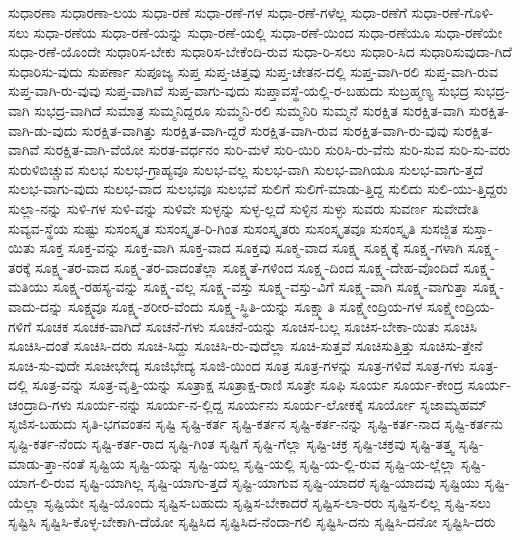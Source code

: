 {ಸುಧಾರಣಾ
ಸುಧಾರಣಾ-ಲಯ
ಸುಧಾ-ರಣೆ
ಸುಧಾ-ರಣೆ-ಗಳ
ಸುಧಾ-ರಣೆ-ಗಳೆಲ್ಲ
ಸುಧಾ-ರಣೆಗೆ
ಸುಧಾ-ರಣೆ-ಗೊಳಿ-ಸಲು
ಸುಧಾ-ರಣೆಯ
ಸುಧಾ-ರಣೆ-ಯನ್ನು
ಸುಧಾ-ರಣೆ-ಯಲ್ಲಿ
ಸುಧಾ-ರಣೆ-ಯಿಂದ
ಸುಧಾ-ರಣೆಯೂ
ಸುಧಾ-ರಣೆಯೇ
ಸುಧಾ-ರಣೆ-ಯೊಂದೇ
ಸುಧಾರಿಸ-ಬೇಕು
ಸುಧಾರಿಸ-ಬೇಕೆಂದಿ-ರುವ
ಸುಧಾ-ರಿ-ಸಲು
ಸುಧಾರಿ-ಸಿದ
ಸುಧಾರಿಸುವುದಾ-ಗಿದೆ
ಸುಧಾರಿಸು-ವುದು
ಸುಪರ್ಣಾ
ಸುಪೂಜ್ಯ
ಸುಪ್ತ
ಸುಪ್ತ-ಚಿತ್ತವು
ಸುಪ್ತ-ಚೇತನ-ದಲ್ಲಿ
ಸುಪ್ತ-ವಾಗಿ-ರಲಿ
ಸುಪ್ತ-ವಾಗಿ-ರುವ
ಸುಪ್ತ-ವಾಗಿ-ರು-ವುವು
ಸುಪ್ತ-ವಾಗಿವೆ
ಸುಪ್ತ-ವಾಗು-ವುದು
ಸುಪ್ತಾವಸ್ಥೆ-ಯಲ್ಲಿ-ರ-ಬಹುದು
ಸುಬ್ರಹ್ಮಣ್ಯ
ಸುಭದ್ರ
ಸುಭದ್ರ-ವಾಗಿ
ಸುಭದ್ರ-ವಾಗಿದೆ
ಸುಮಾತ್ರ
ಸುಮ್ಮನಿದ್ದರೂ
ಸುಮ್ಮನಿ-ರಲಿ
ಸುಮ್ಮನಿರಿ
ಸುಮ್ಮನೆ
ಸುರಕ್ಷಿತ
ಸುರಕ್ಷಿತ-ವಾಗಿ
ಸುರಕ್ಷಿತ-ವಾಗಿ-ಡು-ವುದು
ಸುರಕ್ಷಿತ-ವಾಗಿತ್ತು
ಸುರಕ್ಷಿತ-ವಾಗಿ-ದ್ದರೆ
ಸುರಕ್ಷಿತ-ವಾಗಿ-ರುವ
ಸುರಕ್ಷಿತ-ವಾಗಿ-ರು-ವುವು
ಸುರಕ್ಷಿತ-ವಾಗಿವೆ
ಸುರಕ್ಷಿತ-ವಾಗಿ-ವೆಯೋ
ಸುರತ-ವರ್ಧನಂ
ಸುರಿ-ಮಳೆ
ಸುರಿ-ಯಿರಿ
ಸುರಿಸಿ-ರು-ವೆನು
ಸುರಿ-ಸುವ
ಸುರಿ-ಸು-ವರು
ಸುರುಳಿಬಿಚ್ಚುವ
ಸುಲಭ
ಸುಲಭ-ಗ್ರಾಹ್ಯವೂ
ಸುಲಭ-ವಲ್ಲ
ಸುಲಭ-ವಾಗಿ
ಸುಲಭ-ವಾಗಿಯೂ
ಸುಲಭ-ವಾಗು-ತ್ತದೆ
ಸುಲಭ-ವಾಗು-ವುದು
ಸುಲಭ-ವಾದ
ಸುಲಭವೂ
ಸುಲಭವೆ
ಸುಲಿಗೆ
ಸುಲಿಗೆ-ಮಾಡು-ತ್ತಿದ್ದ
ಸುಲಿದು
ಸುಲಿ-ಯು-ತ್ತಿದ್ದರು
ಸುಲ್ಲಾ-ನನ್ನು
ಸುಳಿ-ಗಳ
ಸುಳಿ-ವನ್ನು
ಸುಳಿವೇ
ಸುಳ್ಳನ್ನು
ಸುಳ್ಳ-ಲ್ಲದೆ
ಸುಳ್ಳಿನ
ಸುಳ್ಳು
ಸುವರು
ಸುವರ್ಣ
ಸುವೇದೇತಿ
ಸುವ್ಯವ-ಸ್ಥೆಯ
ಸುಷ್ಟು
ಸುಸಂಸ್ಕೃತ
ಸುಸಂಸ್ಕೃತ-ರಿ-ಗಿಂತ
ಸುಸಂಸ್ಕೃತರು
ಸುಸಂಸ್ಕೃತವೂ
ಸುಸಂಸ್ಕೃತಿ
ಸುಸಜ್ಜಿತ
ಸುಸ್ತಾ-ಯಿತು
ಸೂಕ್ತ
ಸೂಕ್ತ-ವನ್ನು
ಸೂಕ್ತ-ವಾಗಿ
ಸೂಕ್ತ-ವಾದ
ಸೂಕ್ತವು
ಸೂಕ್ಮ-ವಾದ
ಸೂಕ್ಷ್ಮ
ಸೂಕ್ಷ್ಮಕ್ಕೆ
ಸೂಕ್ಷ್ಮ-ಗಳಾಗಿ
ಸೂಕ್ಷ್ಮ-ತರಕ್ಕೆ
ಸೂಕ್ಷ್ಮ-ತರ-ವಾದ
ಸೂಕ್ಷ್ಮ-ತರ-ವಾದಂತೆಲ್ಲಾ
ಸೂಕ್ಷ್ಮತೆ-ಗಳಿಂದ
ಸೂಕ್ಷ್ಮ-ದಿಂದ
ಸೂಕ್ಷ್ಮ-ದೇಹ-ವೊಂದಿದೆ
ಸೂಕ್ಷ್ಮ-ಮತಿಯು
ಸೂಕ್ಷ್ಮ-ರಹಸ್ಯ-ವನ್ನು
ಸೂಕ್ಷ್ಮ-ವಲ್ಲ
ಸೂಕ್ಷ್ಮ-ವಸ್ತು
ಸೂಕ್ಷ್ಮ-ವಸ್ತು-ವಿಗೆ
ಸೂಕ್ಷ್ಮ-ವಾಗಿ
ಸೂಕ್ಷ್ಮ-ವಾಗುತ್ತಾ
ಸೂಕ್ಷ್ಮ-ವಾದು-ದನ್ನು
ಸೂಕ್ಷ್ಮವೂ
ಸೂಕ್ಷ್ಮ-ಶರೀರ-ವೆಂದು
ಸೂಕ್ಷ್ಮ-ಸ್ಥಿತಿ-ಯನ್ನು
ಸೂಕ್ಷ್ಮಾತಿ
ಸೂಕ್ಷ್ಮೇಂದ್ರಿಯ-ಗಳ
ಸೂಕ್ಷ್ಮೇಂದ್ರಿಯ-ಗಳಿಗೆ
ಸೂಚಕ
ಸೂಚಕ-ವಾಗಿದೆ
ಸೂಚನೆ-ಗಳು
ಸೂಚನೆ-ಯನ್ನು
ಸೂಚಿಸ-ಬಲ್ಲ
ಸೂಚಿಸ-ಬೇಕಾ-ಯಿತು
ಸೂಚಿಸಿ
ಸೂಚಿಸಿ-ದಂತೆ
ಸೂಚಿಸಿ-ದರು
ಸೂಚಿ-ಸಿದ್ದು
ಸೂಚಿಸಿ-ರು-ವುದೆಲ್ಲಾ
ಸೂಚಿ-ಸುತ್ತವೆ
ಸೂಚಿಸುತ್ತಿತ್ತು
ಸೂಚಿಸು-ತ್ತೇನೆ
ಸೂಚಿ-ಸು-ವುದೇ
ಸೂಚೀಭೇದ್ಯ
ಸೂಜಿಭೇದ್ಯ
ಸೂಜಿ-ಯಿಂದ
ಸೂತ್ರ
ಸೂತ್ರ-ಗಳನ್ನು
ಸೂತ್ರ-ಗಳಿವೆ
ಸೂತ್ರ-ಗಳು
ಸೂತ್ರ-ದಲ್ಲಿ
ಸೂತ್ರ-ವನ್ನು
ಸೂತ್ರ-ವೃತ್ತಿ-ಯನ್ನು
ಸೂತ್ರಾಕ್ಷ
ಸೂತ್ರಾಕ್ಷ-ರಾಣಿ
ಸೂತ್ರೇ
ಸೂಫಿ
ಸೂರ್ಯ
ಸೂರ್ಯ-ಕೇಂದ್ರ
ಸೂರ್ಯ-ಚಂದ್ರಾದಿ-ಗಳು
ಸೂರ್ಯ-ನನ್ನು
ಸೂರ್ಯ-ನ-ಲ್ಲಿದ್ದ
ಸೂರ್ಯನು
ಸೂರ್ಯ-ಲೋಕಕ್ಕೆ
ಸೂರ್ಯೋ
ಸೃಜಾಮ್ಯಹಮ್
ಸೃಜಿಸ-ಬಹುದು
ಸೃತಿ-ಭಗವಂತನ
ಸೃಷ್ಟಿ
ಸೃಷ್ಟಿ-ಕರ್ತ
ಸೃಷ್ಟಿ-ಕರ್ತನ
ಸೃಷ್ಟಿ-ಕರ್ತ-ನನ್ನು
ಸೃಷ್ಟಿ-ಕರ್ತ-ನಾದ
ಸೃಷ್ಟಿ-ಕರ್ತನು
ಸೃಷ್ಟಿ-ಕರ್ತ-ನೆಂದು
ಸೃಷ್ಟಿ-ಕರ್ತ-ರಾದ
ಸೃಷ್ಟಿ-ಗಿಂತ
ಸೃಷ್ಟಿಗೆ
ಸೃಷ್ಟಿ-ಗೆಲ್ಲಾ
ಸೃಷ್ಟಿ-ಚಕ್ರ
ಸೃಷ್ಟಿ-ಚಕ್ರವು
ಸೃಷ್ಟಿ-ತತ್ತ್ವ
ಸೃಷ್ಟಿ-ಮಾಡು-ತ್ತಾ-ನಂತೆ
ಸೃಷ್ಟಿಯ
ಸೃಷ್ಟಿ-ಯನ್ನು
ಸೃಷ್ಟಿ-ಯಲ್ಲ
ಸೃಷ್ಟಿ-ಯಲ್ಲಿ
ಸೃಷ್ಟಿ-ಯ-ಲ್ಲಿ-ರುವ
ಸೃಷ್ಟಿ-ಯ-ಲ್ಲೆಲ್ಲಾ
ಸೃಷ್ಟಿ-ಯಾಗ-ಲಿ-ರುವ
ಸೃಷ್ಟಿ-ಯಾಗಿಲ್ಲ
ಸೃಷ್ಟಿ-ಯಾಗು-ತ್ತದೆ
ಸೃಷ್ಟಿ-ಯಾಗುವ
ಸೃಷ್ಟಿ-ಯಾದರೆ
ಸೃಷ್ಟಿ-ಯಾದವು
ಸೃಷ್ಟಿಯು
ಸೃಷ್ಟಿ-ಯೆಲ್ಲಾ
ಸೃಷ್ಟಿಯೇ
ಸೃಷ್ಟಿ-ಯೊಂದು
ಸೃಷ್ಟಿಸ-ಬಹುದು
ಸೃಷ್ಟಿಸ-ಬೇಕಾದರೆ
ಸೃಷ್ಟಿಸ-ಲಾ-ರರು
ಸೃಷ್ಟಿಸ-ಲಿಲ್ಲ
ಸೃಷ್ಟಿ-ಸಲು
ಸೃಷ್ಟಿಸಿ
ಸೃಷ್ಟಿಸಿ-ಕೊಳ್ಳ-ಬೇಕಾಗಿ-ದೆಯೋ
ಸೃಷ್ಟಿಸಿದ
ಸೃಷ್ಟಿಸಿದ-ನೆಂದಾ-ಗಲಿ
ಸೃಷ್ಟಿಸಿ-ದನು
ಸೃಷ್ಟಿಸಿ-ದನೋ
ಸೃಷ್ಟಿಸಿ-ದರು
}
